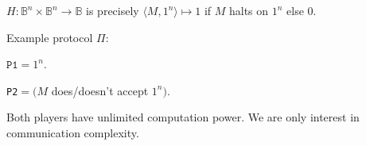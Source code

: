 \begin{example}[$A_{TM}$]
\(H : \mathbb{B}^n \times \mathbb{B}^n \to \mathbb{B}\)
is precisely
\(\langle M, 1^{n} \rangle \mapsto 1\)
if $M$ halts on $1^{n}$ else 0.
\end{example}
\pause
Example protocol $\Pi$:\\
\begin{rightbubbles}
{\footnotesize $\texttt{P1}=1^{n}$.}
\end{rightbubbles}
\pause
\begin{leftbubbles}
\texttt{P2}$=(M$ does/doesn't accept $1^{n})$.
\end{leftbubbles}
\pause
Both players have unlimited computation power.
We are only interest in communication complexity.